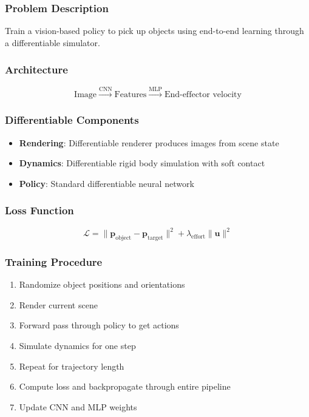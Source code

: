 \subsubsection{Problem Description}

Train a vision-based policy to pick up objects using end-to-end learning through a differentiable simulator.

\subsubsection{Architecture}

\begin{equation}
\text{Image} \xrightarrow{\text{CNN}} \text{Features} \xrightarrow{\text{MLP}} \text{End-effector velocity}
\end{equation}

\subsubsection{Differentiable Components}

\begin{itemize}
    \item \textbf{Rendering}: Differentiable renderer produces images from scene state
    \item \textbf{Dynamics}: Differentiable rigid body simulation with soft contact
    \item \textbf{Policy}: Standard differentiable neural network
\end{itemize}

\subsubsection{Loss Function}

\begin{equation}
\mathcal{L} = \| \mathbf{p}_{\text{object}} - \mathbf{p}_{\text{target}} \|^2 + \lambda_{\text{effort}} \| \mathbf{u} \|^2
\end{equation}

\subsubsection{Training Procedure}

\begin{enumerate}
    \item Randomize object positions and orientations
    \item Render current scene
    \item Forward pass through policy to get actions
    \item Simulate dynamics for one step
    \item Repeat for trajectory length
    \item Compute loss and backpropagate through entire pipeline
    \item Update CNN and MLP weights
\end{enumerate}

